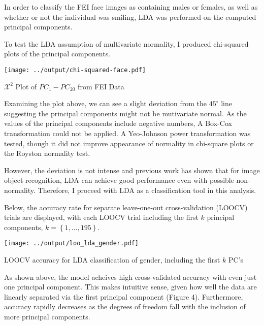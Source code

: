 \documentclass{article}
\newcommand{\crl}[1]{\left\{ #1 \right\}}
\begin{document}
\begin{multicols}{2}
  In order to classify the FEI face images as containing males or females, as well as whether or not the individual was smiling, LDA was performed on the computed principal components.
  
  To test the LDA assumption of multivariate normality, I produced chi-squared plots of the principal components.
  
  \noindent
  \begin{minipage}{\columnwidth}
    \makeatletter
    \newcommand{\@captype}{figure}
    \makeatother
    \centering
    \texttt{[image: ../output/chi-squared-face.pdf]}
    \caption{$\mathcal{X}^2$ Plot of $PC_1-PC_{20}$ from FEI Data}
  \end{minipage}

  \vspace{1em}
  Examining the plot above, we can see a slight deviation from the $45^{\circ}$ line suggesting the principal components might not be mutivariate normal. As the values of the principal components include negative numbers, A Box-Cox transformation could not be applied. A Yeo-Johnson power transformation \cite{yeo2000new} was tested, though it did not improve appearance of normality in chi-square plots or the Royston normality test.
  
  However, the deviation is not intense and previous work \cite{li2006using} has shown that for image object recognition, LDA can achieve good performance even with possible non-normality.  Therefore, I proceed with LDA as a classification tool in this analysis.
  
  Below, the accuracy rate for separate leave-one-out cross-validation (LOOCV) trials are displayed, with each LOOCV trial including the first $k$ principal components, $k=\crl{1,\dots,195}$. 

  \noindent
  \begin{minipage}{\columnwidth}
    \makeatletter
    \newcommand{\@captype}{figure}
    \makeatother
    \centering
    \texttt{[image: ../output/loo\_lda\_gender.pdf]}
    \caption{LOOCV accuracy for LDA classification of gender, including the first $k$ PC's}
  \end{minipage}
  
  \vspace{1em}
  As shown above, the model acheives high cross-validated accuracy with even just one principal component. This makes intuitive sense, given how well the data are linearly separated via the first principal component (Figure 4). Furthermore, accuracy rapidly decreases as the degrees of freedom fall with the inclusion of more principal components.
  

\end{multicols}
\end{document}
